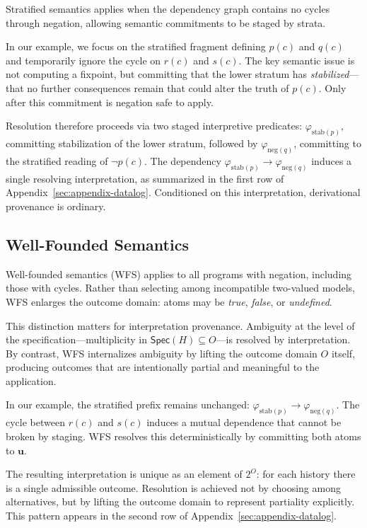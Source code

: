 \documentclass[acmsmall,nonacm]{acmart}
\theoremstyle{remark}
\numberwithin{definition}{section}
\numberwithin{theorem}{section}
\numberwithin{lemma}{section}
\numberwithin{corollary}{section}
\numberwithin{remark}{section}
\numberwithin{example}{section}
\numberwithin{observation}{section}
\numberwithin{assumption}{section}
\newcommand{\Spec}{\mathsf{Spec}}
\begin{document}
Stratified semantics applies when the dependency graph contains no cycles through
negation, allowing semantic commitments to be staged by strata.

In our example, we focus on the stratified fragment defining $p(c)$ and $q(c)$ and
temporarily ignore the cycle on $r(c)$ and $s(c)$.
The key semantic issue is not computing a fixpoint, but committing that the lower
stratum has \emph{stabilized}—that no further consequences remain that could alter
the truth of $p(c)$.
Only after this commitment is negation safe to apply.

Resolution therefore proceeds via two staged interpretive predicates:
$\varphi_{\mathrm{stab}(p)}$, committing stabilization of the lower stratum, followed
by $\varphi_{\mathrm{neg}(q)}$, committing to the stratified reading of $\neg p(c)$.
The dependency
$\varphi_{\mathrm{stab}(p)} \rightarrow \varphi_{\mathrm{neg}(q)}$
induces a single resolving interpretation, as summarized in the first row of
Appendix~\ref{sec:appendix-datalog}.
Conditioned on this interpretation, derivational provenance is ordinary.

\subsection{Well-Founded Semantics}

Well-founded semantics (WFS) applies to all programs with negation, including those
with cycles.
Rather than selecting among incompatible two-valued models, WFS enlarges the
outcome domain: atoms may be \emph{true}, \emph{false}, or \emph{undefined}.

This distinction matters for interpretation provenance.
Ambiguity at the level of the specification—multiplicity in $\Spec(H) \subseteq
O$—is resolved by interpretation.
By contrast, WFS internalizes ambiguity by lifting the outcome domain $O$ itself,
producing outcomes that are intentionally partial and meaningful to the
application.

In our example, the stratified prefix remains unchanged:
$\varphi_{\mathrm{stab}(p)} \rightarrow \varphi_{\mathrm{neg}(q)}$.
The cycle between $r(c)$ and $s(c)$ induces a mutual dependence that cannot be
broken by staging.
WFS resolves this deterministically by committing both atoms to $\mathbf{u}$.

The resulting interpretation is unique as an element of $2^O$: for each history
there is a single admissible outcome.
Resolution is achieved not by choosing among alternatives, but by lifting the
outcome domain to represent partiality explicitly.
This pattern appears in the second row of
Appendix~\ref{sec:appendix-datalog}.
\end{document}
